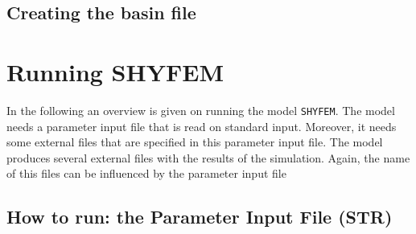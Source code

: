 \documentclass{report}
\newcommand{\shy}{{\tt SHYFEM}}
\newcommand{\todo}[1]{This section still has to be written by #1}
\begin{document}



	\section{Creating the basin file}
	



\chapter{Running SHYFEM}


In the following an overview is given on running the model
\shy{}. The model needs a parameter input file that is read 
on standard input. Moreover, it needs some external files that
are specified in this parameter input file. The model produces
several external files with the results of the simulation. Again,
the name of this files can be influenced by the parameter input file

\section{How to run: the Parameter Input File (STR)}



\end{document}
